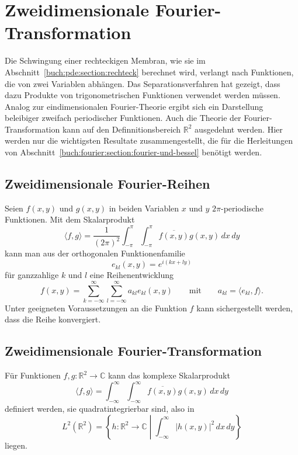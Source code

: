 %
%
%
\section{Zweidimensionale Fourier-Transformation
\label{buch:fourier:section:2d}}
Die Schwingung einer rechteckigen Membran, wie sie im
Abschnitt~\ref{buch:pde:section:rechteck} berechnet wird,
verlangt nach Funktionen, die von zwei Variablen abhängen.
Das Separationsverfahren hat gezeigt, dass dazu Produkte
von trigonometrischen Funktionen verwendet werden müssen.
Analog zur eindimensionalen Fourier-Theorie ergibt sich
ein Darstellung beleibiger zweifach periodischer Funktionen.
Auch die Theorie der Fourier-Transformation kann auf
den Definnitionsbereich $\mathbb{R}^2$ ausgedehnt werden.
Hier werden nur die wichtigsten Resultate zusammengestellt,
die für die Herleitungen von
Abschnitt~\ref{buch:fourier:section:fourier-und-bessel}
benötigt werden.

%
%
\subsection{Zweidimensionale Fourier-Reihen}
Seien $f(x,y)$ und $g(x,y)$ in beiden Variablen $x$ und $y$
$2\pi$-periodische Funktionen.
Mit dem Skalarprodukt
\[
\langle f,g\rangle
=
\frac{1}{(2\pi)^2}
\int_{-\pi}^\pi
\int_{-\pi}^\pi
\overline{f(x,y)} g(x,y)
\,dx
\,dy
\]
kann man aus der orthogonalen Funktionenfamilie
\[
e_{kl}(x,y)
=
e^{i(kx + ly)}
\]
für ganzzahlige $k$ und $l$ eine Reihenentwicklung
\[
f(x,y)
=
\sum_{k=-\infty}^\infty
\sum_{l=-\infty}^\infty
a_{kl}
e_{kl}(x,y)
\qquad\text{mit}\qquad
a_{kl}
=
\langle e_{kl},f\rangle.
\]
Unter geeigneten Voraussetzungen an die Funktion $f$ kann sichergestellt
werden, dass die Reihe konvergiert.

%
%
\subsection{Zweidimensionale Fourier-Transformation}
Für Funktionen $f,g\colon \mathbb{R}^2 \to \mathbb{C}$ kann das komplexe
Skalarprodukt
\[
\langle f,g\rangle
=
\int_{-\infty}^\infty
\int_{-\infty}^\infty
\overline{f(x,y)} g(x,y)
\,dx\,dy
\]
definiert werden, sie quadratintegrierbar sind, also in
\[
L^2(\mathbb{R}^2)
=
\left\{
h\colon \mathbb{R}^2\to \mathbb{C}
\;\left|\;
\int_{-\infty}^\infty |h(x,y)|^2\,dx\,dy
\right.
\right\}
\]
%
liegen.

